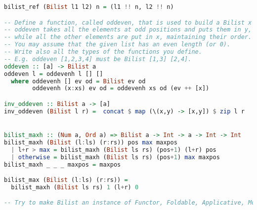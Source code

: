 \begin{lstlisting}[language=Haskell]
bilist_ref (Bilist l1 l2) n = (l1 !! n, l2 !! n)

-- Define a function, called oddeven, that is used to build a Bilist x y from a simple list. 
-- oddeven takes all the elements at odd positions and puts them in y, 
-- while all the other elements are put in x, maintaining their order. 
-- You may assume that the given list has an even length (or 0). 
-- Write also all the types of the functions you define.
-- E.g. oddeven [1,2,3,4] must be Bilist [1,3] [2,4].
oddeven :: [a] -> Bilist a
oddeven l = oddevenh l [] []
  where oddevenh [] ev od = Bilist ev od
        oddevenh (x:xs) ev od = oddevenh xs od (ev ++ [x])

inv_oddeven :: Bilist a -> [a]
inv_oddeven (Bilist l r) =  concat $ map (\(x,y) -> [x,y]) $ zip l r


bilist_maxh :: (Num a, Ord a) => Bilist a -> Int -> a -> Int -> Int
bilist_maxh (Bilist (l:ls) (r:rs)) pos max maxpos
  | l+r > max = bilist_maxh (Bilist ls rs) (pos+1) (l+r) pos
  | otherwise = bilist_maxh (Bilist ls rs) (pos+1) max maxpos
bilist_maxh _ _ _ maxpos = maxpos

bilist_max (Bilist (l:ls) (r:rs)) =
  bilist_maxh (Bilist ls rs) 1 (l+r) 0

-- Try to make Bilist an instance of Functor, Foldable, Applicative, Monad.
\end{lstlisting}
